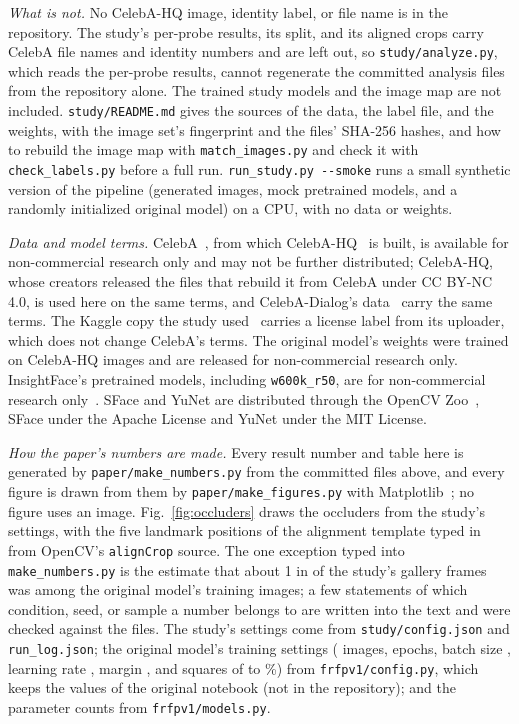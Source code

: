 \textit{What is not.} No CelebA-HQ image, identity label, or file name is in the repository. The study's per-probe results, its split, and its aligned crops carry CelebA file names and identity numbers and are left out, so \texttt{study/\allowbreak analyze.py}, which reads the per-probe results, cannot regenerate the committed analysis files from the repository alone. The  trained study models and the image map are not included. \texttt{study/\allowbreak README.md} gives the sources of the data, the label file, and the weights, with the image set's fingerprint and the files' SHA-256 hashes, and how to rebuild the image map with \texttt{match\_images.py} and check it with \texttt{check\_labels.py} before a full run. \texttt{run\_study.py -{}-smoke} runs a small synthetic version of the pipeline (generated images, mock pretrained models, and a randomly initialized original model) on a CPU, with no data or weights.

\textit{Data and model terms.} CelebA~\cite{liu2015celeba}, from which CelebA-HQ~\cite{karras2018pggan} is built, is available for non-commercial research only and may not be further distributed; CelebA-HQ, whose creators released the files that rebuild it from CelebA under CC BY-NC 4.0, is used here on the same terms, and CelebA-Dialog's data~\cite{jiang2021talk} carry the same terms. The Kaggle copy the study used~\cite{kagglecelebahq} carries a license label from its uploader, which does not change CelebA's terms. The original model's weights were trained on CelebA-HQ images and are released for non-commercial research only. InsightFace's pretrained models, including \texttt{w600k\_r50}, are for non-commercial research only~\cite{insightface}. SFace and YuNet are distributed through the OpenCV Zoo~\cite{opencvzoo}, SFace under the Apache License and YuNet under the MIT License.

\textit{How the paper's numbers are made.} Every result number and table here is generated by \texttt{paper/\allowbreak make\_numbers.py} from the committed files above, and every figure is drawn from them by \texttt{paper/\allowbreak make\_figures.py} with Matplotlib~\cite{hunter2007matplotlib}; no figure uses an image. Fig.~\ref{fig:occluders} draws the occluders from the study's settings, with the five landmark positions of the alignment template typed in from OpenCV's \texttt{alignCrop} source. The one exception typed into \texttt{make\_numbers.py} is the estimate that about 1 in  of the study's gallery frames was among the original model's training images; a few statements of which condition, seed, or sample a number belongs to are written into the text and were checked against the files. The study's settings come from \texttt{study/\allowbreak config.json} and \texttt{run\_log.json}; the original model's training settings ( images,  epochs, batch size , learning rate , margin , and squares of  to \%) from \texttt{frfpv1/\allowbreak config.py}, which keeps the values of the original notebook (not in the repository); and the parameter counts from \texttt{frfpv1/\allowbreak models.py}.
